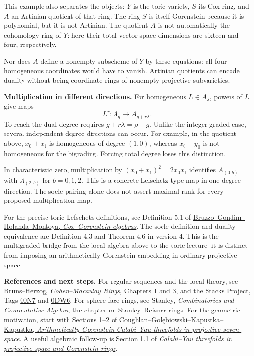 This example also separates the objects:
$Y$ is the toric variety, $S$ its Cox ring,
and $A$ an Artinian quotient of that ring.
The ring $S$ is itself Gorenstein because
it is polynomial, but it is not Artinian.
The quotient $A$ is not automatically the
cohomology ring of $Y$: here their total
vector-space dimensions are sixteen and
four, respectively.

Nor does $A$ define a nonempty subscheme of
$Y$ by these equations: all four homogeneous
coordinates would have to vanish.
Artinian quotients can encode duality
without being coordinate rings of nonempty
projective subvarieties.

\medskip\noindent
{\bf Multiplication in different directions.}
For homogeneous $L\in A_\lambda$, powers
of $L$ give maps
$$
L^r:A_g\longrightarrow A_{g+r\lambda}.
$$
To reach the dual degree requires
$g+r\lambda=\rho-g$.
Unlike the integer-graded case, several
independent degree directions can occur.
For example, in the quotient above,
$x_0+x_1$ is homogeneous of degree $(1,0)$,
whereas $x_0+y_0$ is not homogeneous for
the bigrading. Forcing total degree loses
this distinction.

In characteristic zero, multiplication by
$(x_0+x_1)^2=2x_0x_1$ identifies
$A_{(0,b)}$ with $A_{(2,b)}$ for
$b=0,1,2$. This is a concrete Lefschetz-type
map in one degree direction. The socle
pairing alone does not assert maximal rank
for every proposed multiplication map.

For the precise toric Lefschetz definitions,
see Definition 5.1 of
\href{https://arxiv.org/abs/2407.17811}%
{Bruzzo--Gondim--Holanda--Montoya,
\textit{Cox--Gorenstein algebras}}.
The socle definition and duality equivalence
are Definition 4.3 and Theorem 4.6 in
version 4. This is the multigraded bridge
from the local algebra above to the toric
lecture; it is distinct from imposing an
arithmetically Gorenstein embedding in
ordinary projective space.

\medskip\noindent
{\bf References and next steps.}
For regular sequences and the local theory,
see Bruns--Herzog,
{\it Cohen--Macaulay Rings},
Chapters 1 and 3, and the Stacks Project,
Tags \href{https://stacks.math.columbia.edu/%
tag/00N7}{00N7} and
\href{https://stacks.math.columbia.edu/%
tag/0DW6}{0DW6}.
For sphere face rings, see Stanley,
{\it Combinatorics and Commutative Algebra},
the chapter on Stanley--Reisner rings.
For the geometric motivation, start with
Sections 1--2 of
\href{https://arxiv.org/abs/1609.01195}%
{Coughlan--Go\l\k{e}biowski--Kapustka--%
Kapustka,
\textit{Arithmetically Gorenstein
Calabi--Yau threefolds in projective
seven-space}}.
A useful algebraic follow-up is Section 1.1
of \href{https://arxiv.org/abs/2011.10871}%
{\textit{Calabi--Yau threefolds in projective
space and Gorenstein rings}}.

